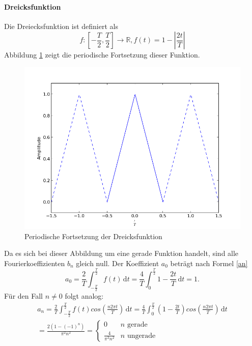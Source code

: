 \documentclass[11pt,ngerman,a4paper]{article}
\begin{document}
\paragraph{Dreicksfunktion}
Die Dreiecksfunktion ist definiert als
\begin{equation}
f \colon  \left[-\frac{T}{2}, \frac{T}{2}\right]\to \mathbb{R}, f(t) = 1 - \left|\frac{2t}{T}\right|
\end{equation}
Abbildung \ref{org_hut} zeigt die periodische Fortsetzung dieser Funktion.
\begin{figure}[htp]
\centering
\includegraphics[scale=0.7]{abb/Abb2.png}
\caption{Periodische Fortsetzung der Dreicksfunktion}
\label{org_hut}
\end{figure} Da es sich bei dieser Abbildung um eine gerade Funktion handelt, sind alle Fourierkoeffizienten $b_n$ gleich null. Der Koeffizient $a_0$ betr\"agt nach Formel \ref{an}
\begin{equation} 
a_0 =\frac{2}{T} \int_{-\frac{T}{2}}^{\frac{T}2}\!f(t)\,\mathrm dt= \frac4T \int_{0}^{\frac{T}2}\!1-\frac{2t}{T}\,\mathrm dt= 1.
\end{equation}
F\"ur den Fall $n \neq 0$ folgt analog:
\begin{align}
a_n =\frac{2}{T} \int_{-\frac{T}{2}}^{\frac{T}2}\!f(t)cos\left(\frac{n2\pi t}{T}\right) \,\mathrm dt = \frac{4}{T} \int_0^\frac{T}2\!\left(1-\frac{2t}{T}\right)cos\left(\frac{n2\pi t}{T}\right)\,\mathrm dt \\= \frac{2 (1-(-1)^n)}{\pi^2n^2} = \begin{cases}
0 & n\mbox{ gerade} \\ \frac{4}{\pi^2n^2} & n\mbox{ ungerade}
\end{cases}
\end{align} 
\end{document}
